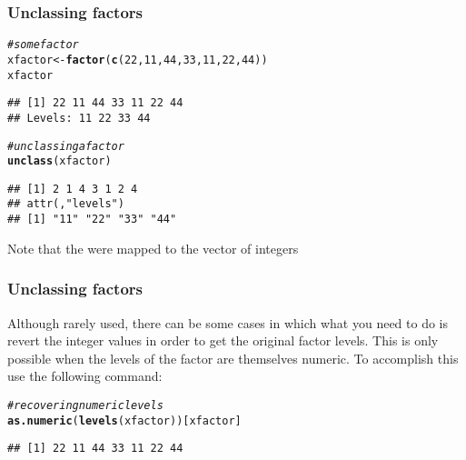 \documentclass[12pt]{beamer}\usepackage[]{graphicx}\usepackage[]{color}
\makeatletter
\newcommand{\hlnum}[1]{\textcolor[rgb]{0.686,0.059,0.569}{#1}}%
\newcommand{\hlcom}[1]{\textcolor[rgb]{0.678,0.584,0.686}{\textit{#1}}}%
\newcommand{\hlstd}[1]{\textcolor[rgb]{0.345,0.345,0.345}{#1}}%
\newcommand{\hlkwb}[1]{\textcolor[rgb]{0.69,0.353,0.396}{#1}}%
\newcommand{\hlkwd}[1]{\textcolor[rgb]{0.737,0.353,0.396}{\textbf{#1}}}%
\newenvironment{kframe}{%
 \def\at@end@of@kframe{}%
 \ifinner\ifhmode%
  \def\at@end@of@kframe{\end{minipage}}%
  \begin{minipage}{\columnwidth}%
 \fi\fi%
 \def\FrameCommand##1{\hskip\@totalleftmargin \hskip-\fboxsep
 \colorbox{shadecolor}{##1}\hskip-\fboxsep
     \hskip-\linewidth \hskip-\@totalleftmargin \hskip\columnwidth}%
 \MakeFramed {\advance\hsize-\width
   \@totalleftmargin\z@ \linewidth\hsize
   \@setminipage}}%
 {\par\unskip\endMakeFramed%
 \at@end@of@kframe}
\newenvironment{knitrout}{}{} %
\makeatother
\begin{document}
\begin{frame}[fragile]
\frametitle{Unclassing factors}

\begin{knitrout}\footnotesize
{}\color{fgcolor}\begin{kframe}
\begin{alltt}
\hlcom{# some factor}
\hlstd{xfactor} \hlkwb{<-} \hlkwd{factor}\hlstd{(}\hlkwd{c}\hlstd{(}\hlnum{22}\hlstd{,} \hlnum{11}\hlstd{,} \hlnum{44}\hlstd{,} \hlnum{33}\hlstd{,} \hlnum{11}\hlstd{,} \hlnum{22}\hlstd{,} \hlnum{44}\hlstd{))}
\hlstd{xfactor}
\end{alltt}
\begin{verbatim}
## [1] 22 11 44 33 11 22 44
## Levels: 11 22 33 44
\end{verbatim}
\begin{alltt}
\hlcom{# unclassing a factor}
\hlkwd{unclass}\hlstd{(xfactor)}
\end{alltt}
\begin{verbatim}
## [1] 2 1 4 3 1 2 4
## attr(,"levels")
## [1] "11" "22" "33" "44"
\end{verbatim}
\end{kframe}
\end{knitrout}
Note that the   were mapped to the vector of integers 

\end{frame}


\begin{frame}[fragile]
\frametitle{Unclassing factors}

Although rarely used, there can be some cases in which what you need to do is revert the integer values in order to get the original factor levels. This is only possible when the levels of the factor are themselves numeric. To accomplish this use the following command:
\begin{knitrout}\footnotesize
{}\color{fgcolor}\begin{kframe}
\begin{alltt}
\hlcom{# recovering numeric levels}
\hlkwd{as.numeric}\hlstd{(}\hlkwd{levels}\hlstd{(xfactor))[xfactor]}
\end{alltt}
\begin{verbatim}
## [1] 22 11 44 33 11 22 44
\end{verbatim}
\end{kframe}
\end{knitrout}

\end{frame}
\end{document}
